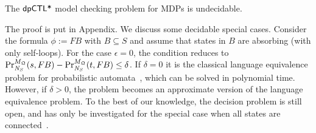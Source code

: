 \begin{theorem}\label{theorem:mdp-model-checking}
The $\dpCTLstar$ model checking problem for MDPs  is undecidable.
\end{theorem}

The proof is put in Appendix. We discuss some decidable special cases. Consider the formula $\phi:=F B$ with $B\subseteq S$ and assume that states in $B$ are absorbing (with only self-loops). For the case $\epsilon=0$, the condition reduces to
$\myPr{s}{M_{\scheduler{Q}}}{\neighbor{S}}{F B} -
\myPr{t}{M_{\scheduler{Q}}}{\neighbor{S}}{F B}\le \delta$. If $\delta=0$ it is the classical language equivalence problem for probabilistic automata~\cite{Rabin63}, which can be solved in polynomial time. However, if $\delta>0$, the problem
becomes an approximate version of the language equivalence problem. To the best of our knowledge, the decision problem is still open, and has only be investigated for the special case when all states are connected~\cite{Tzeng92}.

